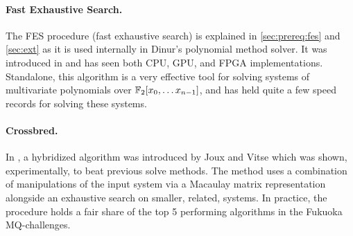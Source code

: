 \paragraph{Fast Exhaustive Search.} The FES procedure (fast exhaustive search) is explained in \cref{sec:prereq:fes} and \cref{sec:ext} as it is used internally in Dinur's polynomial method solver. It was introduced in \cite{ches-2010-23990} and has seen both CPU, GPU, and FPGA implementations. Standalone, this algorithm is a very effective tool for solving systems of multivariate polynomials over $\mathbb{F}_2[x_0,\dots x_{n - 1}]$, and has held quite a few speed records for solving these systems.

\paragraph{Crossbred.} In \cite{cryptoeprint:2017/372}, a hybridized algorithm was introduced by Joux and Vitse which was shown, experimentally, to beat previous solve methods. The method uses a combination of manipulations of the input system via a Macaulay matrix representation alongside an exhaustive search on smaller, related, systems. In practice, the procedure holds a fair share of the top 5 performing algorithms in the Fukuoka MQ-challenges.


\newpage